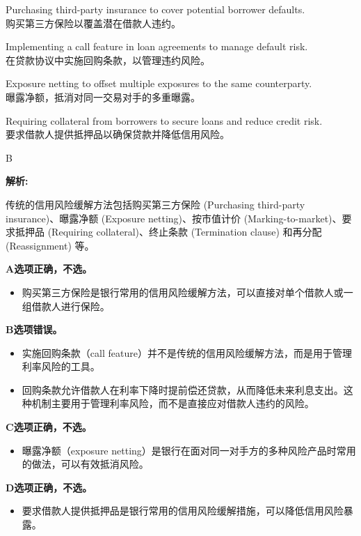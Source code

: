 \documentclass{article}
\newenvironment{explanation}
{\textbf{解析:}\par}
{\par}
\begin{document}
\begin{choices}
    \item Purchasing third-party insurance to cover potential borrower defaults.\\
    购买第三方保险以覆盖潜在借款人违约。
    
    \item Implementing a call feature in loan agreements to manage default risk.\\
    在贷款协议中实施回购条款，以管理违约风险。
    \item Exposure netting to offset multiple exposures to the same counterparty.\\
    曝露净额，抵消对同一交易对手的多重曝露。
    \item Requiring collateral from borrowers to secure loans and reduce credit risk.\\
    要求借款人提供抵押品以确保贷款并降低信用风险。
\end{choices}

\begin{correctanswer}
    B
\end{correctanswer}

\begin{explanation}
    传统的信用风险缓解方法包括购买第三方保险 (Purchasing third-party insurance)、曝露净额 (Exposure netting)、按市值计价 (Marking-to-market)、要求抵押品 (Requiring collateral)、终止条款 (Termination clause) 和再分配 (Reassignment) 等。

    \textbf{A选项正确，不选。}
    \begin{itemize}
        \item 购买第三方保险是银行常用的信用风险缓解方法，可以直接对单个借款人或一组借款人进行保险。
    \end{itemize}
    
    \textbf{B选项错误。}
    \begin{itemize}
        \item 实施回购条款（call feature）并不是传统的信用风险缓解方法，而是用于管理利率风险的工具。
        \item 回购条款允许借款人在利率下降时提前偿还贷款，从而降低未来利息支出。这种机制主要用于管理利率风险，而不是直接应对借款人违约的风险。
    \end{itemize}
    
    \textbf{C选项正确，不选。}
    \begin{itemize}
        \item 曝露净额（exposure netting）是银行在面对同一对手方的多种风险产品时常用的做法，可以有效抵消风险。
    \end{itemize}
    
    \textbf{D选项正确，不选。}
    \begin{itemize}
        \item 要求借款人提供抵押品是银行常用的信用风险缓解措施，可以降低信用风险暴露。
    \end{itemize}
\end{explanation}
\end{document}
